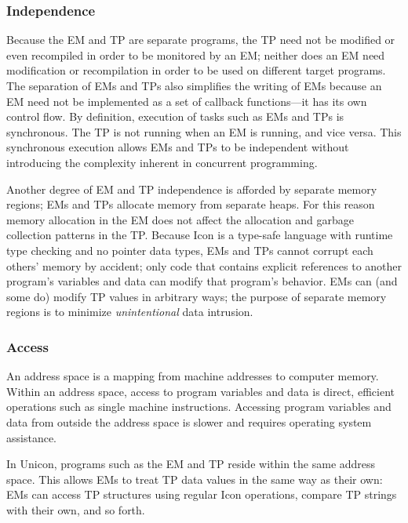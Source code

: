 \subsubsection{Independence}

Because the EM and TP are separate programs, the TP need not be
modified or even recompiled in order to be monitored by an EM; neither
does an EM need modification or recompilation in order to be used on different
target programs.  The separation of EMs and TPs also simplifies the writing
of EMs because an EM need not be implemented as a set of callback
functions---it has its own control flow.  By definition, execution of
tasks such as EMs and TPs is synchronous.  The TP is not
running when an EM is running, and vice versa.  This synchronous
execution allows EMs and TPs to be independent without introducing the
complexity inherent in concurrent programming.

Another degree of EM and TP independence is afforded by separate
memory regions; EMs and TPs allocate memory from separate heaps.
For this reason memory allocation in the EM does not affect the allocation
and garbage collection patterns in the TP.  Because Icon is a type-safe
language with runtime type checking and no pointer data types, EMs
and TPs cannot corrupt each others' memory by accident; only code that
contains explicit references to another program's variables and data
can modify that program's behavior.
EMs can (and some do) modify TP values in arbitrary ways; the purpose
of separate memory regions is to minimize {\em unintentional\/} data
intrusion.


\subsubsection{Access}

An address space is a mapping from machine addresses to computer memory.
Within an address space, access to program variables and data is direct,
efficient operations such as single machine instructions.  Accessing
program variables and data from outside the address space is slower and
requires operating system assistance.

In Unicon, programs such as the EM and TP reside within the same address
space.  This allows EMs to treat TP data values in the same way as
their own: EMs can access TP structures using regular Icon operations,
compare TP strings with their own, and so forth.

